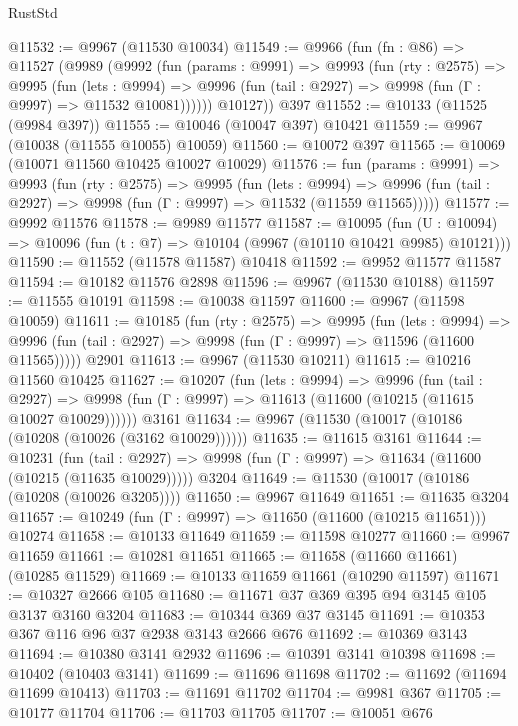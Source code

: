 \begin{lexlean}{RustStd}
\begin{coremodule}
{\begin{coremodule}
{{{{{{{{{{{{{{{{{{{{{{{{{{{{{{{{{{{{{{{{{{{{{{{{{{{{{{{{{{{{{{{{{{{{{{{{{{{{{{@11532 := @9967 (@11530 @10034)
@11549 := @9966
    (fun (fn : @86) =>
    @11527
      (@9989
        (@9992
          (fun (params : @9991) =>
          @9993
            (fun (rty : @2575) =>
            @9995
              (fun (lets : @9994) =>
              @9996 (fun (tail : @2927) => @9998 (fun (Γ : @9997) => @11532 @10081))))))
        @10127))
    @397
@11552 := @10133 (@11525 (@9984 @397))
@11555 := @10046 (@10047 @397) @10421
@11559 := @9967 (@10038 (@11555 @10055) @10059)
@11560 := @10072 @397
@11565 := @10069 (@10071 @11560 @10425 @10027 @10029)
@11576 := fun (params : @9991) =>
  @9993
    (fun (rty : @2575) =>
    @9995
      (fun (lets : @9994) =>
      @9996 (fun (tail : @2927) => @9998 (fun (Γ : @9997) => @11532 (@11559 @11565)))))
@11577 := @9992 @11576
@11578 := @9989 @11577
@11587 := @10095
    (fun (U : @10094) => @10096 (fun (t : @7) => @10104 (@9967 (@10110 @10421 @9985) @10121)))
@11590 := @11552 (@11578 @11587) @10418
@11592 := @9952 @11577 @11587
@11594 := @10182 @11576 @2898
@11596 := @9967 (@11530 @10188)
@11597 := @11555 @10191
@11598 := @10038 @11597
@11600 := @9967 (@11598 @10059)
@11611 := @10185
    (fun (rty : @2575) =>
    @9995
      (fun (lets : @9994) =>
      @9996 (fun (tail : @2927) => @9998 (fun (Γ : @9997) => @11596 (@11600 @11565)))))
    @2901
@11613 := @9967 (@11530 @10211)
@11615 := @10216 @11560 @10425
@11627 := @10207
    (fun (lets : @9994) =>
    @9996
      (fun (tail : @2927) =>
      @9998 (fun (Γ : @9997) => @11613 (@11600 (@10215 (@11615 @10027 @10029))))))
    @3161
@11634 := @9967 (@11530 (@10017 (@10186 (@10208 (@10026 (@3162 @10029))))))
@11635 := @11615 @3161
@11644 := @10231
    (fun (tail : @2927) => @9998 (fun (Γ : @9997) => @11634 (@11600 (@10215 (@11635 @10029)))))
    @3204
@11649 := @11530 (@10017 (@10186 (@10208 (@10026 @3205))))
@11650 := @9967 @11649
@11651 := @11635 @3204
@11657 := @10249 (fun (Γ : @9997) => @11650 (@11600 (@10215 @11651))) @10274
@11658 := @10133 @11649
@11659 := @11598 @10277
@11660 := @9967 @11659
@11661 := @10281 @11651
@11665 := @11658 (@11660 @11661) (@10285 @11529)
@11669 := @10133 @11659 @11661 (@10290 @11597)
@11671 := @10327 @2666 @105
@11680 := @11671 @37 @369 @395 @94 @3145 @105 @3137 @3160 @3204
@11683 := @10344 @369 @37 @3145
@11691 := @10353 @367 @116 @96 @37 @2938 @3143 @2666 @676
@11692 := @10369 @3143
@11694 := @10380 @3141 @2932
@11696 := @10391 @3141 @10398
@11698 := @10402 (@10403 @3141)
@11699 := @11696 @11698
@11702 := @11692 (@11694 @11699 @10413)
@11703 := @11691 @11702
@11704 := @9981 @367
@11705 := @10177 @11704
@11706 := @11703 @11705
@11707 := @10051 @676
}}}}}}}}}}}}}}}}}}}}}}}}}}}}}}}}}}}}}}}}}}}}}}}}}}}}}}}}}}}}}}}}}}}}}}}}}}}}}}
\end{coremodule}}
\end{coremodule}
\end{lexlean}
